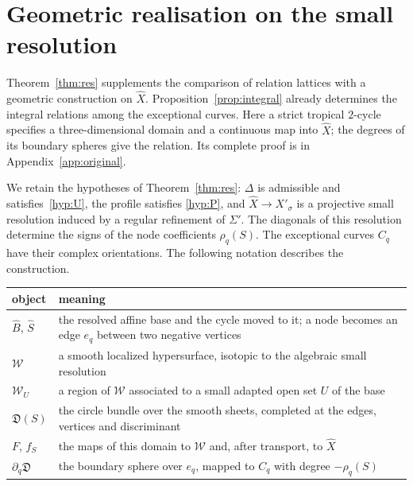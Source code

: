 \section{Geometric realisation on the small resolution}\label{sec:resolution}

Theorem~\ref{thm:res} supplements the comparison of relation lattices with a geometric construction on
$\widehat X$. Proposition~\ref{prop:integral} already determines the integral relations among the exceptional curves.
Here a strict tropical $2$-cycle specifies a three-dimensional domain and a continuous map into $\widehat X$;
the degrees of its boundary spheres give the relation. Its complete proof is in Appendix~\ref{app:original}.

We retain the hypotheses of Theorem~\ref{thm:res}: $\Delta$ is admissible and satisfies~\ref{hyp:U}, the profile satisfies
\ref{hyp:P}, and $\widehat X\to X'_\sigma$ is a projective small resolution induced by a regular refinement of
$\Sigma'$. The diagonals of this resolution determine the signs of the node coefficients $\rho_q(S)$.
The exceptional curves $C_q$ have their complex orientations. The following notation describes the construction.
\begin{center}\small
\begin{tabular}{p{2.7cm}p{10.3cm}}
object & meaning\\\hline
$\widehat B$, $\hat S$ & the resolved affine base and the cycle moved to it; a node becomes an edge $e_q$ between two negative vertices\\
$\mathscr W$ & a smooth localized hypersurface, isotopic to the algebraic small resolution\\
$\mathscr W_U$ & a region of $\mathscr W$ associated to a small adapted open set $U$ of the base\\
$\mathfrak D(S)$ & the circle bundle over the smooth sheets, completed at the edges, vertices and discriminant\\
$F$, $f_S$ & the maps of this domain to $\mathscr W$ and, after transport, to $\widehat X$\\
$\partial_q\mathfrak D$ & the boundary sphere over $e_q$, mapped to $C_q$ with degree $-\rho_q(S)$
\end{tabular}
\end{center}

